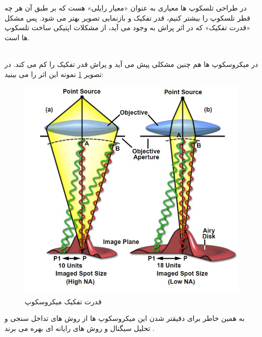 \documentclass{article}
\begin{document}
در طراحی تلسکوپ ها معیاری به عنوان «معیار رایلی» هست که بر طبق آن هر چه قطر تلسکوپ را بیشتر کنیم، قدر تفکیک و بازنمایی تصویر بهتر می شود. پس مشکل «قدرت تفکیک» که در اثر پراش به وجود می آید، از مشکلات اپتیکی ساخت تلسکوپ ها است.

\noindent\\
در میکروسکوپ ها هم چنین مشکلی پیش می آید و پراش قدر تفکیک را کم می کند.
در تصویر 
\ref{Fig4}
نمونه این اثر را می بینید:
\begin{figure}[h]
	\centering
	\includegraphics[scale=0.75]{4.jpg}
	\caption{قدرت تفکیک میکروسکوپ}
	\label{Fig4}
\end{figure}
به همین خاطر برای دقیقتر شدن این میکروسکوپ ها از روش های تداخل سنجی و تحلیل سیگنال و روش های رایانه ای بهره می برند
.
\end{document}
